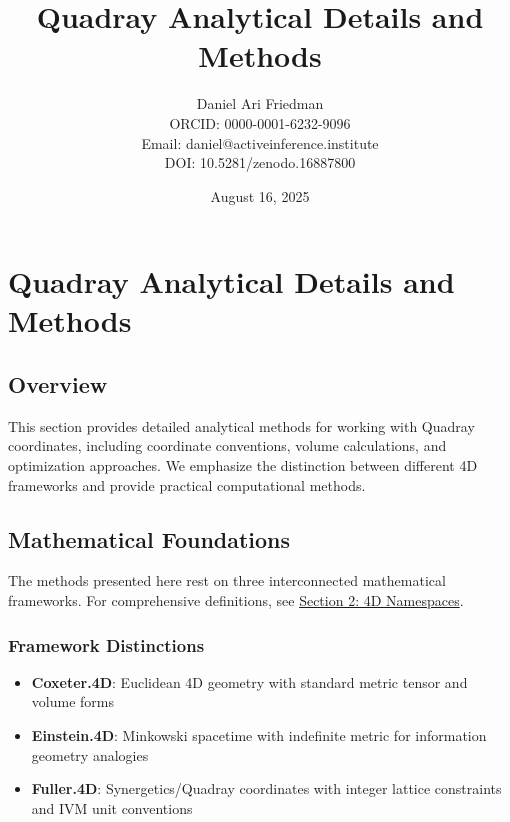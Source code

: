 \documentclass[
  10pt,
]{article}
\title{Quadray Analytical Details and Methods}
\author{Daniel Ari Friedman\\ ORCID: 0000-0001-6232-9096\\ Email: daniel@activeinference.institute\\ DOI: 10.5281/zenodo.16887800}
\date{August 16, 2025}
\providecommand{\tightlist}{%
  \setlength{\itemsep}{0pt}\setlength{\parskip}{0pt}}
\begin{document}
\maketitle

{
\hypersetup{linkcolor=black}
\setcounter{tocdepth}{3}
\tableofcontents
}
\hypertarget{quadray-analytical-details-and-methods}{%
\section{Quadray Analytical Details and
Methods}\label{quadray-analytical-details-and-methods}}

\hypertarget{overview}{%
\subsection{Overview}\label{overview}}

This section provides detailed analytical methods for working with
Quadray coordinates, including coordinate conventions, volume
calculations, and optimization approaches. We emphasize the distinction
between different 4D frameworks and provide practical computational
methods.

\hypertarget{mathematical-foundations}{%
\subsection{Mathematical Foundations}\label{mathematical-foundations}}

The methods presented here rest on three interconnected mathematical
frameworks. For comprehensive definitions, see
\href{02_4d_namespaces.md}{Section 2: 4D Namespaces}.

\hypertarget{framework-distinctions}{%
\subsubsection{Framework Distinctions}\label{framework-distinctions}}

\begin{itemize}
\tightlist
\item
  \textbf{Coxeter.4D}: Euclidean 4D geometry with standard metric tensor
  and volume forms
\item
  \textbf{Einstein.4D}: Minkowski spacetime with indefinite metric for
  information geometry analogies\\
\item
  \textbf{Fuller.4D}: Synergetics/Quadray coordinates with integer
  lattice constraints and IVM unit conventions
\end{itemize}
\end{document}
